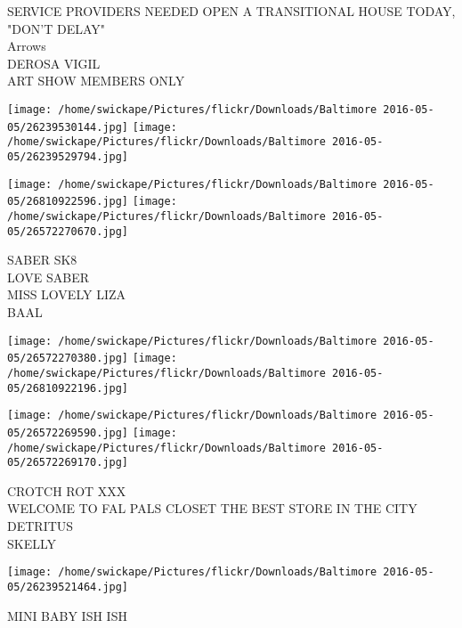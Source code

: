 \documentclass[10pt,letterpaper]{article}
\begin{document}
SERVICE PROVIDERS NEEDED OPEN A TRANSITIONAL HOUSE TODAY, "DON'T DELAY"\\
Arrows\\
DEROSA VIGIL\\
ART SHOW MEMBERS ONLY\\
\pagebreak

\texttt{[image: /home/swickape/Pictures/flickr/Downloads/Baltimore 2016-05-05/26239530144.jpg]}
\texttt{[image: /home/swickape/Pictures/flickr/Downloads/Baltimore 2016-05-05/26239529794.jpg]}

\texttt{[image: /home/swickape/Pictures/flickr/Downloads/Baltimore 2016-05-05/26810922596.jpg]}
\texttt{[image: /home/swickape/Pictures/flickr/Downloads/Baltimore 2016-05-05/26572270670.jpg]}

SABER SK8\\
LOVE SABER\\
MISS LOVELY LIZA\\
BAAL\\
\pagebreak

\texttt{[image: /home/swickape/Pictures/flickr/Downloads/Baltimore 2016-05-05/26572270380.jpg]}
\texttt{[image: /home/swickape/Pictures/flickr/Downloads/Baltimore 2016-05-05/26810922196.jpg]}

\texttt{[image: /home/swickape/Pictures/flickr/Downloads/Baltimore 2016-05-05/26572269590.jpg]}
\texttt{[image: /home/swickape/Pictures/flickr/Downloads/Baltimore 2016-05-05/26572269170.jpg]}

CROTCH ROT XXX\\
WELCOME TO FAL PALS CLOSET THE BEST STORE IN THE CITY\\
DETRITUS\\
SKELLY\\
\pagebreak

\texttt{[image: /home/swickape/Pictures/flickr/Downloads/Baltimore 2016-05-05/26239521464.jpg]}

MINI BABY ISH ISH\\
\pagebreak
\end{document}
